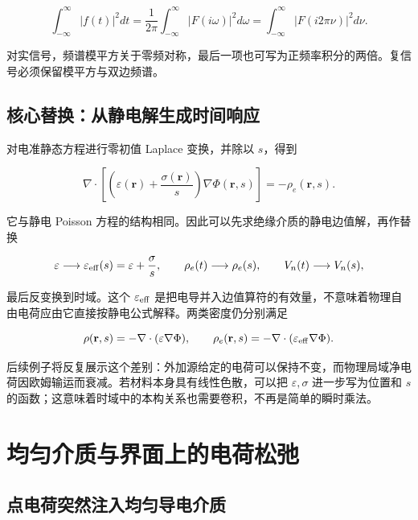 \documentclass[
  11pt,
  a4paper,
  oneside,
  openany]{report}
\numberwithin{equation}{chapter}
\begin{document}
\begin{equation}
\int_{-\infty}^{\infty}|f(t)|^2dt
=\frac{1}{2\pi}\int_{-\infty}^{\infty}|F(i\omega)|^2d\omega
=\int_{-\infty}^{\infty}|F(i2\pi\nu)|^2d\nu.
\end{equation}

对实信号，频谱模平方关于零频对称，最后一项也可写为正频率积分的两倍。复信号必须保留模平方与双边频谱。

\section{核心替换：从静电解生成时间响应}\label{sec-epsilon-effective}

对电准静态方程进行零初值 Laplace 变换，并除以 \(s\)，得到

\begin{equation}
\nabla\cdot\left[\left(\varepsilon(\mathbf r)+\frac{\sigma(\mathbf r)}s\right)
\nabla\Phi(\mathbf r,s)\right]=-\rho_e(\mathbf r,s).
\end{equation}

它与静电 Poisson
方程的结构相同。因此可以先求绝缘介质的静电边值解，再作替换

\begin{equation}
\varepsilon\longrightarrow\varepsilon_{\rm eff}(s)
=\varepsilon+\frac\sigma s,\qquad
\rho_e(t)\longrightarrow\rho_e(s),\qquad
V_n(t)\longrightarrow V_n(s),
\end{equation}

最后反变换到时域。这个 \(\varepsilon_{\rm eff}\)
是把电导并入边值算符的有效量，不意味着物理自由电荷应由它直接按静电公式解释。两类密度仍分别满足

\begin{equation}
\rho(\mathbf r,s)=-\nabla\cdot(\varepsilon\nabla\Phi),
\qquad
\rho_e(\mathbf r,s)=-\nabla\cdot(\varepsilon_{\rm eff}\nabla\Phi).
\end{equation}

后续例子将反复展示这个差别：外加源给定的电荷可以保持不变，而物理局域净电荷因欧姆输运而衰减。若材料本身具有线性色散，可以把
\(\varepsilon,\sigma\) 进一步写为位置和 \(s\)
的函数；这意味着时域中的本构关系也需要卷积，不再是简单的瞬时乘法。

\chapter{均匀介质与界面上的电荷松弛}\label{chap-relaxation}

\section{点电荷突然注入均匀导电介质}\label{sec-point-relaxation}
\end{document}
